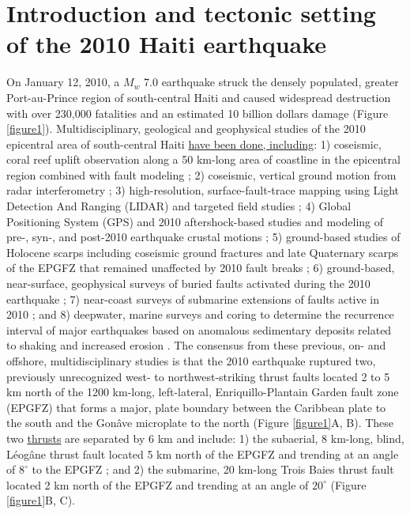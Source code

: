 \documentclass[linenumbers,draft]{agujournal}
\begin{document}
\section{Introduction and tectonic setting of the 2010 Haiti earthquake}
\label{sec:intro}
On January 12, 2010, a $M_w$ 7.0 earthquake struck the densely populated, greater Port-au-Prince region of south-central Haiti and caused widespread destruction with over 230,000 fatalities and an estimated 10 billion dollars damage \citep{prentice2010seismic,bilham2010lessons,paultre2013damage,kocel2016near} (Figure \ref{figure1}). Multidisciplinary, geological and geophysical studies of the 2010 epicentral area of south-central Haiti \ul{have been done, including}: 1) coseismic, coral reef uplift observation along a 50 km-long area of coastline in the epicentral region combined with fault modeling \citep{hayes2010complex}; 2) coseismic, vertical ground motion from radar interferometry \citep{hashimoto2011fan}; 3) high-resolution, surface-fault-trace mapping using Light Detection And Ranging (LIDAR) and targeted field studies \citep{cowgill2012interactive}; 4) Global Positioning System (GPS) and 2010 aftershock-based studies and modeling of pre-, syn-, and post-2010 earthquake crustal motions \citep{calais2010transpressional,nettles2010earthquake,symithe2013coseismic,douilly2013crustal,douilly2015three}; 5) ground-based studies of Holocene scarps including coseismic ground fractures and late Quaternary scarps of the EPGFZ that remained unaffected by 2010 fault breaks \citep{prentice2010seismic,koehler2011field,rathje2014geotechnical,saint2015seismotectonics}; 6) ground-based, near-surface, geophysical surveys of buried faults activated during the 2010 earthquake \citep{kocel2016near}; 7) near-coast surveys of submarine extensions of faults active in 2010 \citep{hornbach2010high,mercier20112010}; and 8) deepwater, marine surveys and coring to determine the recurrence interval of major earthquakes based on anomalous sedimentary deposits related to shaking and increased erosion \citep{mchugh2011offshore}. The consensus from these previous, on- and offshore, multidisciplinary studies is that the 2010 earthquake ruptured two, previously unrecognized west- to northwest-striking thrust faults located 2 to 5 km north of the 1200 km-long, left-lateral, Enriquillo-Plantain Garden fault zone (EPGFZ) that forms a major, plate boundary between the Caribbean plate to the south and the Gon\^ave microplate to the north \citep{mann1995actively,calais2010transpressional,benford2012gps,corbeau2016transpressive} (Figure \ref{figure1}A, B). These two \ul{thrusts} are separated by 6 km and include: 1) the subaerial, 8 km-long, blind, L\'eog\^ane thrust fault located 5 km north of the EPGFZ and trending at an angle of $8^{\circ}$ to the EPGFZ \citep{calais2010transpressional,douilly2013crustal,douilly2015three}; and 2) the submarine, 20 km-long Trois Baies thrust fault located 2 km north of the EPGFZ and trending at an angle of $20^{\circ}$ \citep{mercier20112010,symithe2013coseismic} (Figure \ref{figure1}B, C).
\end{document}
